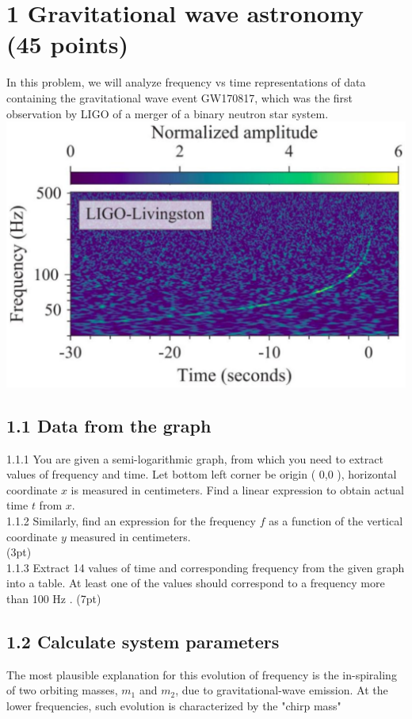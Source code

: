 \documentclass[10pt]{article}
\begin{document}
\section*{1 Gravitational wave astronomy (45 points)}
In this problem, we will analyze frequency vs time representations of data containing the gravitational wave event GW170817, which was the first observation by LIGO of a merger of a binary neutron star system.\\
\includegraphics[max width=\textwidth, center]{2025_09_11_3681df2e94a9f94ef296g-2}

\subsection*{1.1 Data from the graph}
1.1.1 You are given a semi-logarithmic graph, from which you need to extract values of frequency and time. Let bottom left corner be origin ( 0,0 ), horizontal coordinate $x$ is measured in centimeters. Find a linear expression to obtain actual time $t$ from $x$.\\
1.1.2 Similarly, find an expression for the frequency $f$ as a function of the vertical coordinate $y$ measured in centimeters.\\
(3pt)\\
1.1.3 Extract 14 values of time and corresponding frequency from the given graph into a table. At least one of the values should correspond to a frequency more than 100 Hz . (7pt)

\subsection*{1.2 Calculate system parameters}
The most plausible explanation for this evolution of frequency is the in-spiraling of two orbiting masses, $m_{1}$ and $m_{2}$, due to gravitational-wave emission. At the lower frequencies, such evolution is characterized by the "chirp mass"
\end{document}
